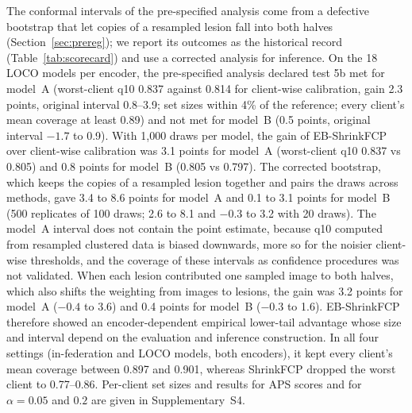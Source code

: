 The conformal intervals of the pre-specified analysis come from a defective bootstrap that let copies of a
resampled lesion fall into both halves (Section~\ref{sec:prereg}); we report its outcomes as the historical
record (Table~\ref{tab:scorecard}) and use a corrected analysis for inference. On the 18 LOCO models per
encoder, the pre-specified analysis declared test 5b met for model~A (worst-client q10 0.837 against 0.814
for client-wise calibration, gain 2.3 points, original interval 0.8--3.9; set sizes within 4\% of the
reference; every client's mean coverage at least 0.89) and not met for model~B (0.5 points, original
interval $-1.7$ to 0.9). With 1,000 draws per model, the gain of EB-ShrinkFCP over client-wise calibration
was 3.1 points for model~A (worst-client q10 0.837 vs 0.805) and 0.8 points for model~B (0.805 vs 0.797).
The corrected bootstrap, which keeps the copies of a resampled lesion together and pairs the draws across
methods, gave 3.4 to 8.6 points for model~A and 0.1 to 3.1 points for model~B (500 replicates of 100 draws;
2.6 to 8.1 and $-0.3$ to 3.2 with 20 draws). The model~A interval does not contain the point estimate,
because q10 computed from resampled clustered data is biased downwards, more so for the noisier client-wise
thresholds, and the coverage of these intervals as confidence procedures was not validated. When each lesion
contributed one sampled image to both halves, which also shifts the weighting from images to lesions, the
gain was 3.2 points for model~A ($-0.4$ to 3.6) and 0.4 points for model~B ($-0.3$ to 1.6). EB-ShrinkFCP
therefore showed an encoder-dependent empirical lower-tail advantage whose size and interval depend on the
evaluation and inference construction. In all four settings (in-federation and LOCO models, both
encoders), it kept every client's mean coverage between 0.897 and 0.901, whereas ShrinkFCP dropped the worst
client to 0.77--0.86. Per-client set sizes and results for APS scores and for $\alpha=0.05$ and $0.2$ are
given in Supplementary~S4.

